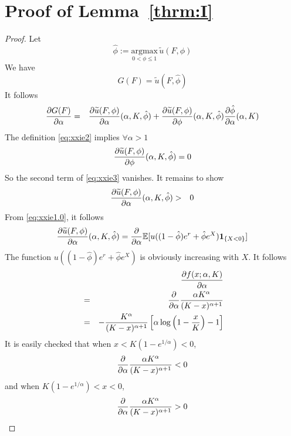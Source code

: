 \documentclass[11pt,a4]{amsart}
\newcommand{\pd}{\partial}
\newcommand{\wt}{\widetilde}
\newcommand{\E }{{\mathbb E}}
\newcommand{\1}{{\mathbf 1}}
\begin{document}
\section{Proof of Lemma~\ref{thrm:I}}
\label{sec:thrmI_proof}
\begin{proof}
  Let
  \begin{equation}
    \label{eq:xxie2}
    \hat \phi := \underset{0 < \phi \leq 1}{\text{argmax}}\,
    \wt u(F, \phi)
  \end{equation}
  We have
  \[
  G(F) = \wt u(F, \hat\phi)
  \]
  It follows
  \begin{eqnarray}
    {\pd G(F) \over \pd \alpha}
    &=&
    {\pd \wt u(F, \phi) \over \pd \alpha}(\alpha, K, \hat\phi)
    + {\pd \wt u(F, \phi) \over \pd \phi}(\alpha, K, \hat\phi)
    {\pd \hat\phi \over \pd \alpha}(\alpha, K)
    \label{eq:xxie3}
  \end{eqnarray}
  The definition \eqref{eq:xxie2} implies $\forall \alpha > 1$
  \begin{equation}
    \label{eq:xxie4}
    {\pd \wt u(F, \phi) \over \pd \phi}(\alpha, K, \hat \phi) = 0
  \end{equation}
  So the second term of \eqref{eq:xxie3} vanishes. It remains to show
  \begin{eqnarray*}
    {\pd \wt u(F, \phi) \over \pd \alpha}(\alpha, K, \hat \phi)
    &>& 0
  \end{eqnarray*}
  From \eqref{eq:xxie1.0}, it follows
  \begin{eqnarray*}
    {\pd \wt u(F, \phi) \over \pd \alpha}(\alpha, K, \hat\phi)
    = {\partial \over \partial \alpha}\E[u((1 - \hat\phi) e^r + \hat\phi e^X) \1_{\{X < 0\}}]
  \end{eqnarray*}
  The function $u((1 - \hat\phi) e^r + \hat\phi e^X)$ is obviously
  increasing with $X$. It follows
  \begin{eqnarray*}
    && {\pd f(x; \alpha, K) \over \pd \alpha} \\
    &=& {\partial \over \partial \alpha} {\alpha K^\alpha \over (K - x)^{\alpha + 1}} \\
    &=&
    - {K^\alpha \over (K - x)^{\alpha + 1}}
    \left[
      \alpha
      \log\left(
        1 - {x \over K}
      \right) - 1
    \right]
  \end{eqnarray*}
  It is easily checked that when $x < K(1 - e^{1/\alpha}) < 0$,
  \[
  {\partial \over \partial \alpha} {\alpha K^\alpha \over (K - x)^{\alpha + 1}} < 0
  \]
  and when $K(1 - e^{1/\alpha}) < x < 0$,
  \[
  {\partial \over \partial \alpha} {\alpha K^\alpha \over (K - x)^{\alpha + 1}} > 0
\]
\end{proof}
\end{document}
